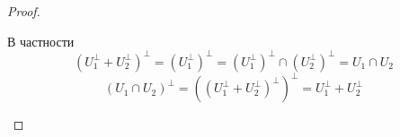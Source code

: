 \begin{proof}
\begin{enumerate}
    В частности 
    $$(U_1^{\bot} + U_2^{\bot})^{\bot} = (U_1^{\bot})^{\bot} = (U_1^{\bot})^{\bot} \cap (U_2^{\bot})^{\bot} = U_1 \cap U_2$$
    $$(U_1 \cap U_2)^{\bot} = ((U_1^{\bot} + U_2^{\bot})^{\bot})^{\bot} = U_1^{\bot} + U_2^{\bot}$$
    $$ $$
    \end{enumerate}
\end{proof}
